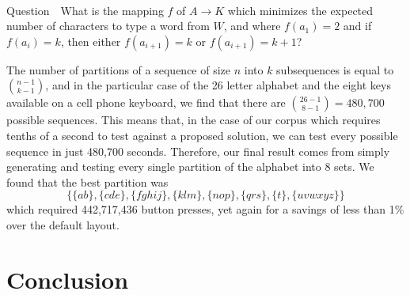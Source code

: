 \documentclass[runningheads]{llncs}
\newcommand{\Question}{~\\
{\sc Question~}}
\begin{document}
\begin{prob}[{\sc
MinimumKeystrokes}]
\begin{prob}[{\sc MinimumKeystrokePartition}]
\Question\ What is the mapping $f$ of $A \to K$ which minimizes the expected number of characters to type a word from $W$, and where $f(a_1) = 2$ and if $f(a_i) = k$, then either $f(a_{i+1}) = k$ or $f(a_{i+1}) = k+1$?
\end{prob}

The number of partitions of a sequence of size $n$ into $k$ subsequences is equal to $\binom{n-1}{k-1}$, and in the particular case of the 26 letter alphabet and the eight keys available on a cell phone keyboard, we find that there are $\binom{26-1}{8-1} = 480,700$ possible sequences.  This means that, in the case of our corpus which requires tenths of a second to test against a proposed solution, we can test every possible sequence in just 480,700 seconds.  Therefore, our final result comes from simply generating and testing every single partition of the alphabet into 8 sets.  We found that the best partition was 
$$\{\{ab\}, \{cde\}, \{fghij\}, \{klm\}, \{nop\}, \{qrs\}, \{t\}, \{uvwxyz\}\}$$
which required 442,717,436 button presses, yet again for a savings of less than 1\% over the default layout.

\section{Conclusion}


\end{prob}
\end{document}
